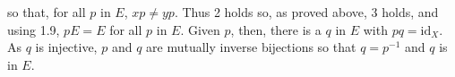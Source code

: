 so that, for all $p$ in $E$, $xp \neq yp$. Thus 2 holds so, as proved above, 3 holds, and using 1.9, $pE = E$ for all $p$ in $E$. Given $p$, then, there is a $q$ in $E$ with $pq = \text{id}_X$. As $q$ is injective, $p$ and $q$ are mutually inverse bijections so that $q = p^{-1}$ and $q$ is in $E$.